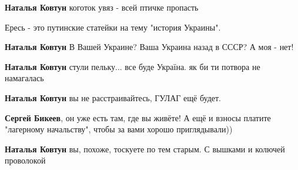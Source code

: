 \begin{itemize}
\begin{itemize}
\textbf{Наталья Ковтун}
коготок увяз - всей птичке пропасть

 
Ересь - это путинские статейки на тему "история Украины".

 
\textbf{Наталья Ковтун} В Вашей Украине? Ваша Украина назад в СССР? А моя - нет!

 
\textbf{Наталья Ковтун} стули пельку... все буде Україна. як би ти потвора не намагалась

 
\textbf{Наталья Ковтун} вы не расстраивайтесь, ГУЛАГ ещё будет.

 
\textbf{Сергей Бикеев}, он уже есть там, где вы живёте! А ещё и взносы платите "лагерному начальству", чтобы за вами хорошо приглядывали))

 
\textbf{Наталья Ковтун} вы, похоже, тоскуете по тем старым. С вышками и колючей проволокой

 

\end{itemize}
\end{itemize}
